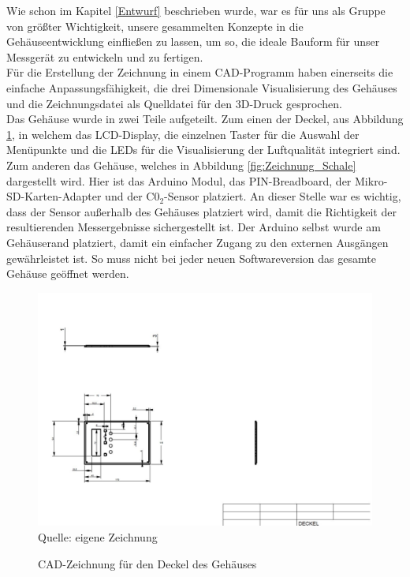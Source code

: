 \label{CADZeichnung}

Wie schon im Kapitel \ref{Entwurf} beschrieben wurde, war es für uns als Gruppe von größter Wichtigkeit, unsere gesammelten Konzepte in die Gehäuseentwicklung einfließen zu lassen, um so, die ideale Bauform für unser Messgerät zu entwickeln und zu fertigen. \\
Für die Erstellung der Zeichnung in einem \ac{CAD}-Programm haben einerseits die einfache Anpassungsfähigkeit, die drei Dimensionale Visualisierung des Gehäuses und die Zeichnungsdatei als Quelldatei für den 3D-Druck gesprochen.\\
Das Gehäuse wurde in zwei Teile aufgeteilt. Zum einen der Deckel, aus Abbildung \ref{fig:Zeichnung_Deckel}, in welchem das \ac{LCD}-Display, die einzelnen Taster für die Auswahl der Menüpunkte und die \ac{LED}s für die Visualisierung der Luftqualität integriert sind. \\
Zum anderen das Gehäuse, welches in Abbildung \ref{fig:Zeichnung_Schale} dargestellt wird. Hier ist das Arduino Modul, das PIN-Breadboard, der Mikro-SD-Karten-Adapter und der C0$_2$-Sensor platziert. An dieser Stelle war es wichtig, dass der Sensor außerhalb des Gehäuses platziert wird, damit die Richtigkeit der resultierenden Messergebnisse sichergestellt ist. Der Arduino selbst wurde am Gehäuserand platziert, damit ein einfacher Zugang zu den externen Ausgängen gewährleistet ist. So muss nicht bei jeder neuen Softwareversion das gesamte Gehäuse geöffnet werden.

\begin{figure}[!hbt]
	\centering
	\includegraphics[width=0.9\linewidth]{Images/CAD-Deckel}
	\footnotesize \\Quelle: eigene Zeichnung
	\caption{\ac{CAD}-Zeichnung für den Deckel des Gehäuses}
	\label{fig:Zeichnung_Deckel}
\end{figure}

